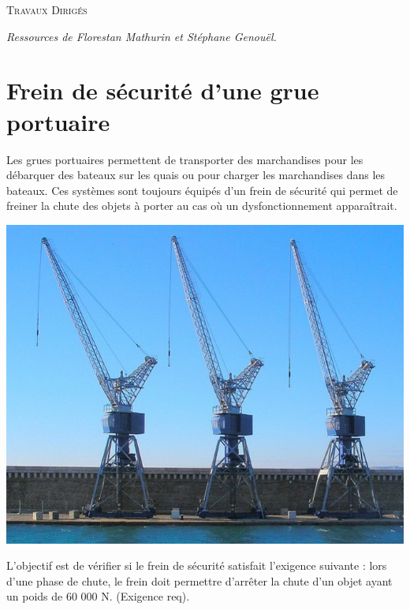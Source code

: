 \documentclass[10pt]{article}
\begin{document}

\begin{center}
\large{\textsc{Travaux Dirigés}}
\end{center}

\begin{flushright}
\textit{Ressources de Florestan Mathurin et Stéphane Genouël.}
\end{flushright}



\section*{Frein de sécurité d'une grue portuaire}

\begin{minipage}[c]{.6\linewidth}
Les grues portuaires permettent de transporter des marchandises pour les débarquer des bateaux sur les quais ou pour charger les marchandises dans les bateaux. Ces systèmes sont toujours équipés d'un frein de sécurité qui permet de freiner la chute des objets à porter au cas où un dysfonctionnement apparaîtrait.

\end{minipage}\hfill
\begin{minipage}[c]{.35\linewidth}
\begin{center}
\includegraphics[width=.95\textwidth]{images/grue}
\end{center}
\end{minipage}


\begin{obj}
  L'objectif est de vérifier si le frein de sécurité satisfait l'exigence suivante : lors d'une phase de chute, le frein doit permettre d'arrêter la chute d'un objet ayant un poids de 60 000 N. (Exigence req).
  
\end{obj}
  
\end{document}
